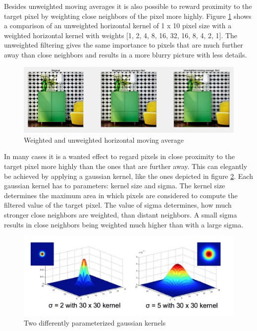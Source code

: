 Besides unweighted moving averages it is also possible to reward proximity to the target pixel by weighting close neighbors of the pixel more highly. Figure \ref{fig:task11} shows a comparison of an unweighted horizontal kernel of 1 x 10 pixel size with a weighted horizontal kernel with weights [1, 2, 4, 8, 16, 32, 16, 8, 4, 2, 1]. The unweighted filtering gives the same importance to pixels that are much further away than close neighbors and results in a more blurry picture with less details.

\begin{figure}[!hbt]
  \includegraphics[width=\textwidth]{./img/task11.png}
  \caption{Weighted and unweighted horizontal moving average}
  \label{fig:task11}
\end{figure}

In many cases it is a wanted effect to regard pixels in close proximity to the target pixel more highly than the ones that are further away. This can elegantly be achieved by applying a gaussian kernel, like the ones depicted in figure \ref{fig:task12}. Each gaussian kernel has to parameters: kernel size and sigma. The kernel size determines the maximum area in which pixels are considered to compute the filtered value of the target pixel. The value of sigma determines, how much stronger close neighbors are weighted, than distant neighbors. A small sigma results in close neighbors being weighted much higher than with a large sigma.

\begin{figure}[!hbt]
  \includegraphics[width=\textwidth]{./img/task12.png}
  \caption{Two differently parameterized gaussian kernels}
  \label{fig:task12}
\end{figure}

